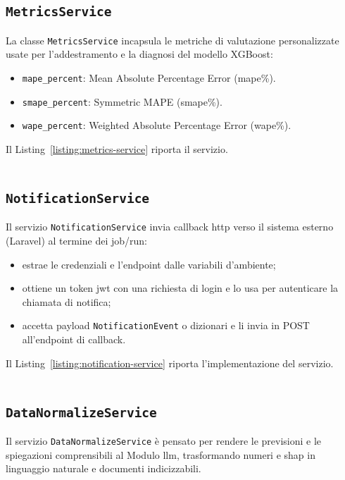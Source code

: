 \subsection{\texttt{MetricsService}}
\label{sec:code-metrics-service}
La classe \texttt{MetricsService} incapsula le metriche di valutazione personalizzate usate per l’addestramento e la diagnosi del modello XGBoost:
\begin{itemize}
    \item \texttt{mape\_percent}: Mean Absolute Percentage Error (\acrshort{mape}\%).
    \item \texttt{smape\_percent}: Symmetric MAPE (\gls{smape}\%).
    \item \texttt{wape\_percent}: Weighted Absolute Percentage Error (\acrshort{wape}\%).
\end{itemize}
Il Listing~\ref{listing:metrics-service} riporta il servizio.
\captionsetup{type=listing, belowskip=0pt}
\inputminted[fontsize=\small, breaklines, breakanywhere=true, linenos=true, bgcolor=gray!10]{python}{code/services/metrics_service.py}
\label{listing:metrics-service}

\subsection{\texttt{NotificationService}}
Il servizio \texttt{NotificationService} invia \gls{callback} \acrshort{http} verso il sistema esterno (Laravel) al termine dei job/run:
\begin{itemize}
    \item estrae le credenziali e l'endpoint dalle variabili d’ambiente;
    \item ottiene un token \acrshort{jwt} con una richiesta di login e lo usa per autenticare la chiamata di notifica;
    \item accetta payload \texttt{NotificationEvent} o dizionari e li invia in POST all’endpoint di \gls{callback}.
\end{itemize}
Il Listing~\ref{listing:notification-service} riporta l’implementazione del servizio.
\captionsetup{type=listing, belowskip=0pt}
\inputminted[fontsize=\small, breaklines, breakanywhere=true, linenos=true, bgcolor=gray!10]{python}{code/services/notification_service.py}
\label{listing:notification-service}

\subsection{\texttt{DataNormalizeService}}
\label{sec:code-normalize-service}
Il servizio \texttt{DataNormalizeService} è pensato per rendere le previsioni e le spiegazioni comprensibili al Modulo \acrshort{llm}, trasformando numeri e \acrshort{shap} in linguaggio naturale e documenti indicizzabili.

